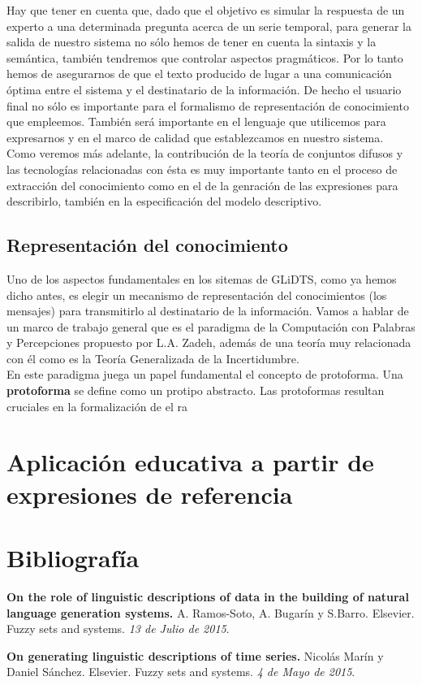 \documentclass[10pt,a4paper]{article}
\begin{document}
Hay que tener en cuenta que, dado que el objetivo es simular la respuesta de un experto a una determinada pregunta acerca de un serie temporal, para generar la salida de nuestro sistema no sólo hemos de tener en cuenta la sintaxis y la semántica, también tendremos que controlar aspectos pragmáticos. Por lo tanto hemos de asegurarnos de que el texto producido de lugar a una comunicación óptima entre el sistema y el destinatario de la información. De hecho el usuario final no sólo es importante para el formalismo de representación de conocimiento que empleemos. También será importante en el lenguaje que utilicemos para expresarnos y en el marco de calidad que establezcamos en nuestro sistema.\\

Como veremos más adelante, la contribución de la teoría de conjuntos difusos y las tecnologías relacionadas con ésta es muy importante tanto en el proceso de extracción del conocimiento como en el de la genración de las expresiones para describirlo, también en la especificación del modelo descriptivo.

\subsection{Representación del conocimiento}

Uno de los aspectos fundamentales en los sitemas de GLiDTS, como ya hemos dicho antes, es elegir un mecanismo de representación del conocimientos (los mensajes) para transmitirlo al destinatario de la información. Vamos a hablar de un marco de trabajo general que es el paradigma de la Computación con Palabras y Percepciones propuesto por L.A. Zadeh, además de una teoría muy relacionada con él como es la Teoría Generalizada de la Incertidumbre.\\

En este paradigma juega un papel fundamental el concepto de protoforma. Una \textbf{protoforma} se define como un protipo abstracto. Las protoformas resultan cruciales en la formalización de el ra







\section{Aplicación educativa a partir de expresiones de referencia}

\newpage

\section{Bibliografía}
\begin{enumerate}[{[}1{]}]
\item \textbf{On the role of linguistic descriptions of data in the building of natural language generation systems.} A. Ramos-Soto, A. Bugarín y S.Barro. Elsevier. Fuzzy sets and systems. \textit{13 de Julio de 2015}.
\item \textbf{On generating linguistic descriptions of time series.} Nicolás Marín y Daniel Sánchez. Elsevier. Fuzzy sets and systems. \textit{4 de Mayo de 2015}.
\end{enumerate}
\end{document}
